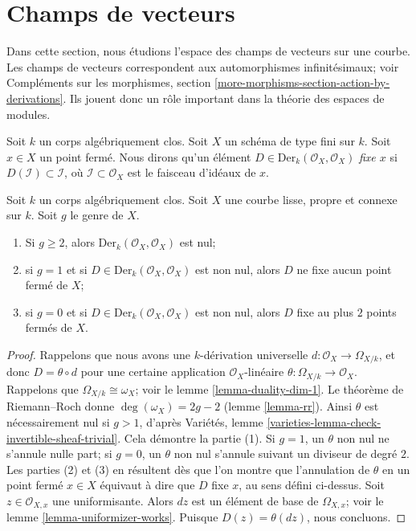 \section{Champs de vecteurs}
\label{section-vector-fields}

\noindent
Dans cette section, nous étudions l'espace des champs de vecteurs sur une courbe. Les champs de vecteurs correspondent aux automorphismes infinitésimaux; voir Compléments sur les morphismes, section \ref{more-morphisms-section-action-by-derivations}. Ils jouent donc un rôle important dans la théorie des espaces de modules.

\medskip\noindent
Soit $k$ un corps algébriquement clos. Soit $X$ un schéma de type fini sur $k$. Soit $x \in X$ un point fermé. Nous dirons qu'un élément $D \in \text{Der}_k(\mathcal{O}_X, \mathcal{O}_X)$ {\it fixe $x$} si $D(\mathcal{I}) \subset \mathcal{I}$, où $\mathcal{I} \subset \mathcal{O}_X$ est le faisceau d'idéaux de $x$.

\begin{lemma}
\label{lemma-smooth-vector-fields}
Soit $k$ un corps algébriquement clos. Soit $X$ une courbe lisse, propre et connexe sur $k$. Soit $g$ le genre de $X$. \begin{enumerate} \item Si $g \geq 2$, alors $\text{Der}_k(\mathcal{O}_X, \mathcal{O}_X)$ est nul; \item si $g = 1$ et si $D \in \text{Der}_k(\mathcal{O}_X, \mathcal{O}_X)$ est non nul, alors $D$ ne fixe aucun point fermé de $X$; \item si $g = 0$ et si $D \in \text{Der}_k(\mathcal{O}_X, \mathcal{O}_X)$ est non nul, alors $D$ fixe au plus $2$ points fermés de $X$.
\end{enumerate}
\end{lemma}

\begin{proof}
Rappelons que nous avons une $k$-dérivation universelle $d : \mathcal{O}_X \to \Omega_{X/k}$, et donc $D = \theta \circ d$ pour une certaine application $\mathcal{O}_X$-linéaire $\theta : \Omega_{X/k} \to \mathcal{O}_X$. Rappelons que $\Omega_{X/k} \cong \omega_X$; voir le lemme \ref{lemma-duality-dim-1}. Le théorème de Riemann--Roch donne $\deg(\omega_X) = 2g - 2$ (lemme \ref{lemma-rr}). Ainsi $\theta$ est nécessairement nul si $g > 1$, d'après Variétés, lemme \ref{varieties-lemma-check-invertible-sheaf-trivial}. Cela démontre la partie (1). Si $g = 1$, un $\theta$ non nul ne s'annule nulle part; si $g = 0$, un $\theta$ non nul s'annule suivant un diviseur de degré $2$. Les parties (2) et (3) en résultent dès que l'on montre que l'annulation de $\theta$ en un point fermé $x \in X$ équivaut à dire que $D$ fixe $x$, au sens défini ci-dessus. Soit $z \in \mathcal{O}_{X, x}$ une uniformisante. Alors $dz$ est un élément de base de $\Omega_{X, x}$; voir le lemme \ref{lemma-uniformizer-works}. Puisque $D(z) = \theta(dz)$, nous concluons.
\end{proof}

